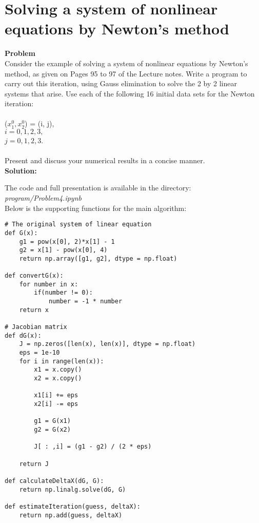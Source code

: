 \newpage
\section{Solving a system of nonlinear equations by Newton's method}%
\label{sec:solving_a_system_of_nonlinear_equations_by_newton_s_method}

\textbf{Problem}
\\
Consider the example of solving a system of nonlinear equations by Newton’s method, as given on Pages 95 to 97 of the Lecture notes. 
Write a program to carry out this iteration, using Gauss elimination to solve the 2 by 2 linear systems
that arise.
Use each of the following 16 initial data sets for the Newton iteration:
\\
\\
($x_{1}^{0}, x_{2}^{0}$) = (i, j),\\
$i = 0, 1, 2, 3, $\\
 $j = 0, 1, 2, 3$.\\
 \\
Present and discuss your numerical results in a concise manner.
\\
\textbf{Solution:}

The code and full presentation is available in the directory: \textit{program/Problem4.ipynb} \\

Below is the supporting functions for the main algorithm:
\begin{lstlisting}
# The original system of linear equation
def G(x):
    g1 = pow(x[0], 2)*x[1] - 1
    g2 = x[1] - pow(x[0], 4)
    return np.array([g1, g2], dtype = np.float)

def convertG(x):
    for number in x:
        if(number != 0):
            number = -1 * number
    return x

# Jacobian matrix
def dG(x):
    J = np.zeros([len(x), len(x)], dtype = np.float)
    eps = 1e-10
    for i in range(len(x)):
        x1 = x.copy()
        x2 = x.copy()

        x1[i] += eps
        x2[i] -= eps

        g1 = G(x1)
        g2 = G(x2)

        J[ : ,i] = (g1 - g2) / (2 * eps)
    
    return J

def calculateDeltaX(dG, G):
    return np.linalg.solve(dG, G)

def estimateIteration(guess, deltaX):
    return np.add(guess, deltaX)
\end{lstlisting}

